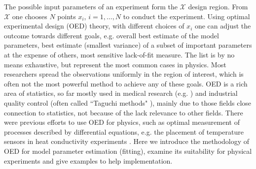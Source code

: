 \documentclass[12pt]{iopart}
\begin{document}
The possible input parameters of an experiment form the $\mathcal{X}$ design region. From $\mathcal{X}$ one chooses $N$ points $x_i$, $i = 1, \ldots, N$ to conduct the experiment. Using optimal experimental design (OED) theory, with different choices of $x_i$ one can adjust the outcome towards different goals, e.g. overall best estimate of the model parameters, best estimate (smallest variance) of a subset of important parameters at the expense of others, most sensitive lack-of-fit measure. The list is by no means exhaustive, but represent the most common cases in physics. Most researchers spread the observations uniformly in the region of interest, which is often not the most powerful method to achieve any of these goals. OED is a rich area of statistics, so far mostly used in medical research (e.g. \cite{Berry1989}) and industrial quality control (often called ``Taguchi methods" \cite{Roy1990}), mainly due to those fields close connection to statistics, not because of the lack relevance to other fields. There were previous efforts to use OED for physics, such as optimal measurement of processes described by differential equations, e.g. the placement of temperature sensors in heat conductivity experiments \cite{Emery1998}. Here we introduce the methodology of OED for model parameter estimation (fitting), examine its suitability for physical experiments and give examples to help implementation.
\end{document}
